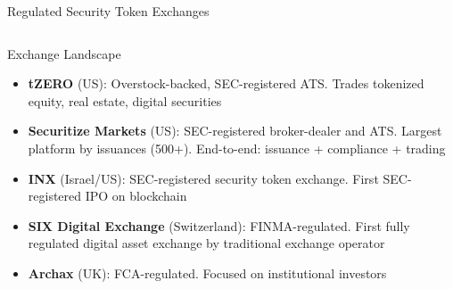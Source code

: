 \documentclass[8pt,aspectratio=169]{beamer}
\begin{document}
\begin{frame}{Regulated Security Token Exchanges}
\begin{columns}[T]
\begin{block}{Exchange Landscape}
\footnotesize
\begin{itemize}
  \item \textbf{tZERO} (US): Overstock-backed, SEC-registered ATS. Trades tokenized equity, real estate, digital securities
  \item \textbf{Securitize Markets} (US): SEC-registered broker-dealer and ATS. Largest platform by issuances (500+). End-to-end: issuance + compliance + trading
  \item \textbf{INX} (Israel/US): SEC-registered security token exchange. First SEC-registered IPO on blockchain
  \item \textbf{SIX Digital Exchange} (Switzerland): FINMA-regulated. First fully regulated digital asset exchange by traditional exchange operator
  \item \textbf{Archax} (UK): FCA-regulated. Focused on institutional investors
\end{itemize}
\end{block}

\vspace{2mm}
\end{columns}
\end{frame}
\end{document}
